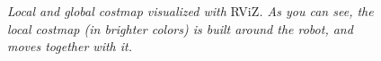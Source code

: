 \begin{figure}
	\centering
	\qquad
	\caption{\textit{Local and global costmap visualized with} RViZ\textit{. As you can see, the local costmap (in brighter colors) is built around the robot, and moves together with it.}}
	\label{fig:localGlobalCostmap}
\end{figure}



